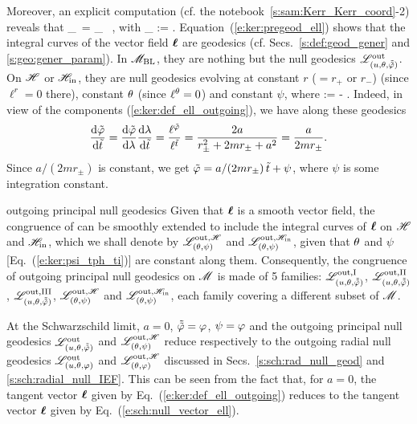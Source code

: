 Moreover, an explicit computation (cf. the notebook~\ref{s:sam:Kerr_Kerr_coord}-2) reveals that
\be \label{e:ker:pregeod_ell}
    \wnab_{\wl}\, \wl = \kappa_{\wl} \, \wl,
    \quad\mbox{with}\quad
    \kappa_{\wl} :=  .
\ee
Equation~(\ref{e:ker:pregeod_ell}) shows that the integral curves of the
vector field $\bm{\ell}$ are geodesics (cf. Secs.~\ref{s:def:geod_gener} and \ref{s:geo:gener_param}).
In $\mathscr{M}_{\rm BL}$, they are nothing but the null geodesics $\mathscr{L}^{\rm out}_{(u,\theta,\tilde{{\tilde\varphi}})}$.
On $\mathscr{H}$ or $\mathscr{H}_{\rm in}$, they are null geodesics evolving at constant $r$ ($=r_+$ or $r_-$)
(since $\ell^r = 0$ there),
constant $\theta$ (since $\ell^\theta = 0$) and constant $\psi$,
where
\be \label{e:ker:psi_tph_ti}
    \psi := \tph -  \ti .
\ee
Indeed, in view of the components (\ref{e:ker:def_ell_outgoing}), we have along these geodesics
\[
    \frac{\mathrm{d}{\tilde\varphi}}{\mathrm{d}{\tilde t}} = \frac{\mathrm{d}{\tilde\varphi}}{\mathrm{d}\lambda} \frac{\mathrm{d}\lambda}{\mathrm{d}{\tilde t}}
    = \frac{\ell^{\tilde\varphi}}{\ell^{\tilde t}} = \frac{2a}{r_\pm^2 + 2 m r_\pm + a^2}
   = \frac{a}{2 m r_\pm}.
\]
Since $a/(2m r_\pm)$ is constant, we get
${\tilde\varphi} = a/(2m r_\pm)\,  {\tilde t} + \psi$, where $\psi$ is some integration constant.

\begin{tprop}{outgoing principal null geodesics}{}
Given that $\bm{\ell}$ is a smooth vector field, the congruence of  can be smoothly extended to include the integral curves of $\bm{\ell}$ on $\mathscr{H}$ and
$\mathscr{H}_{\rm in}$, which we shall denote by
$\mathscr{L}^{{\rm out},\mathscr{H}}_{(\theta,\psi)}$ and $\mathscr{L}^{{\rm out},\mathscr{H}_{\rm in}}_{(\theta,\psi)}$,
given that $\theta$ and $\psi$ [Eq.~(\ref{e:ker:psi_tph_ti})] are constant
along them. Consequently, the congruence of outgoing principal null
geodesics on $\mathscr{M}$ is made of 5 families:
$\mathscr{L}^{\rm out,I}_{(u,\theta,\tilde{{\tilde\varphi}})}$,
$\mathscr{L}^{\rm out,II}_{(u,\theta,\tilde{{\tilde\varphi}})}$,
$\mathscr{L}^{\rm out,III}_{(u,\theta,\tilde{{\tilde\varphi}})}$,
$\mathscr{L}^{{\rm out},\mathscr{H}}_{(\theta,\psi)}$ and $\mathscr{L}^{{\rm out},\mathscr{H}_{\rm in}}_{(\theta,\psi)}$,
each family covering a different subset of $\mathscr{M}$.
\end{tprop}

\begin{remark}
At the Schwarzschild limit, $a=0$, $\tilde{{\tilde\varphi}} = \varphi$, $\psi=\varphi$ and the
outgoing principal null geodesics
$\mathscr{L}^{\rm out}_{(u,\theta,\tilde{{\tilde\varphi}})}$ and
$\mathscr{L}^{{\rm out},\mathscr{H}}_{(\theta,\psi)}$ reduce respectively to the
outgoing radial null geodesics
$\mathscr{L}^{\rm out}_{(u,\theta,\varphi)}$ and
$\mathscr{L}^{{\rm out},\mathscr{H}}_{(\theta,\varphi)}$ discussed in Secs.~\ref{s:sch:rad_null_geod} and \ref{s:sch:radial_null_IEF}. This can be seen from the fact that, for $a=0$, the tangent vector
$\bm{\ell}$ given by Eq.~(\ref{e:ker:def_ell_outgoing}) reduces to the tangent
vector $\bm{\ell}$ given by Eq.~(\ref{e:sch:null_vector_ell}).
\end{remark}



